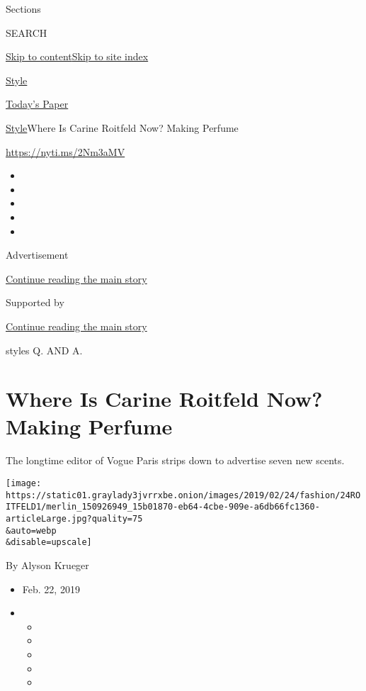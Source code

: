 Sections

SEARCH

\protect\hyperlink{site-content}{Skip to
content}\protect\hyperlink{site-index}{Skip to site index}

\href{https://www.nytimes3xbfgragh.onion/section/style}{Style}

\href{https://myaccount.nytimes3xbfgragh.onion/auth/login?response_type=cookie\&client_id=vi}{}

\href{https://www.nytimes3xbfgragh.onion/section/todayspaper}{Today's
Paper}

\href{/section/style}{Style}\textbar{}Where Is Carine Roitfeld Now?
Making Perfume

\url{https://nyti.ms/2Nm3aMV}

\begin{itemize}
\item
\item
\item
\item
\item
\end{itemize}

Advertisement

\protect\hyperlink{after-top}{Continue reading the main story}

Supported by

\protect\hyperlink{after-sponsor}{Continue reading the main story}

styles Q. AND A.

\hypertarget{where-is-carine-roitfeld-now-making-perfume}{%
\section{Where Is Carine Roitfeld Now? Making
Perfume}\label{where-is-carine-roitfeld-now-making-perfume}}

The longtime editor of Vogue Paris strips down to advertise seven new
scents.

\texttt{[image: https://static01.graylady3jvrrxbe.onion/images/2019/02/24/fashion/24ROITFELD1/merlin\_150926949\_15b01870-eb64-4cbe-909e-a6db66fc1360-articleLarge.jpg?quality=75\\\&auto=webp\\\&disable=upscale]}

By Alyson Krueger

\begin{itemize}
\item
  Feb. 22, 2019
\item
  \begin{itemize}
  \item
  \item
  \item
  \item
  \item
  \end{itemize}
\end{itemize}

